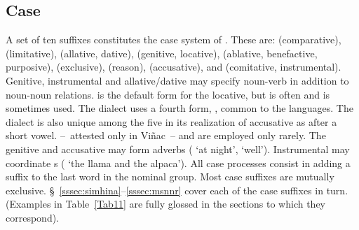 {\subsection{Case}\label{ssec:case}
A set of ten suffixes constitutes the case system of \SYQ. These are:  (comparative),  (limitative),  (allative, dative),  (genitive, locative),  (ablative, benefactive, purposive),  (exclusive),  (reason),  (accusative), and  (comitative, instrumental). Genitive, instrumental and allative/dative may specify noun-verb in addition to noun-noun relations.  is the default form for the locative, but  is often and  is sometimes used. The \CH{} dialect uses a fourth form, , common to the \QI{} languages. The \CH{} dialect is also unique among the five in its realization of accusative  as  after a short vowel.  --~attested only in Viñac~-- and  are employed only rarely. The genitive and accusative may form adverbs ( ‘at night’,  ‘well’). Instrumental  may coordinate s (  ‘the llama and the alpaca’). All case processes consist in adding a suffix to the last word in the nominal group. Most case suffixes are mutually exclusive. §~\ref{sssec:simhina}--\ref{sssec:msnnr} cover each of the case suffixes in turn. (Examples in Table~\ref{Tab11} are fully glossed in the sections to which they correspond).

}
